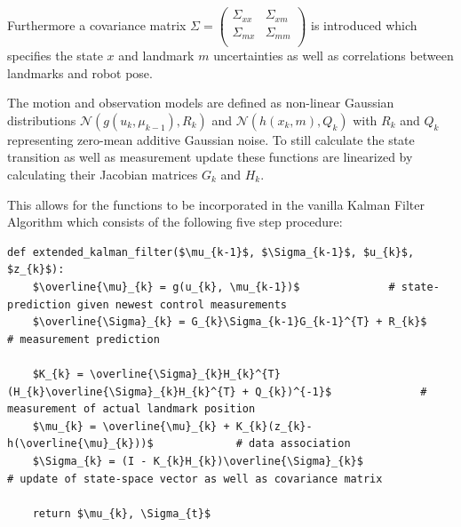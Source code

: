 Furthermore a covariance matrix 
$ \Sigma = 
\begin{pmatrix}
	\Sigma_{xx} & \Sigma_{xm} \\
	\Sigma_{mx} & \Sigma_{mm} \\
\end{pmatrix} $ 
is introduced which specifies the state $ x $ and landmark $ m $ uncertainties as well as correlations between landmarks and robot pose. 

The motion and observation models are defined as non-linear Gaussian distributions $ \mathcal{N}(g(u_{k}, \mu_{k - 1}), R_{k}) $ and $ \mathcal{N}(h(x_{k}, m), Q_{k}) $ with $ R_{k} $ and $ Q_{k} $ representing zero-mean additive Gaussian noise.
To still calculate the state transition as well as measurement update these functions are linearized by calculating their Jacobian matrices $ G_{k} $ and $ H_{k} $.

This allows for the functions to be incorporated in the vanilla Kalman Filter Algorithm which consists of the following five step procedure:

\begin{lstlisting}[mathescape=true, caption={Pseudo-Code describing the filter cycle of a Extenden Kalman Filter},captionpos=b,label={lst:kalman_filter}]
	def extended_kalman_filter($\mu_{k-1}$, $\Sigma_{k-1}$, $u_{k}$, $z_{k}$):
	$\overline{\mu}_{k} = g(u_{k}, \mu_{k-1})$				# state-prediction given newest control measurements
	$\overline{\Sigma}_{k} = G_{k}\Sigma_{k-1}G_{k-1}^{T} + R_{k}$				# measurement prediction 	 		
	
	$K_{k} = \overline{\Sigma}_{k}H_{k}^{T}(H_{k}\overline{\Sigma}_{k}H_{k}^{T} + Q_{k})^{-1}$				# measurement of actual landmark position
	$\mu_{k} = \overline{\mu}_{k} + K_{k}(z_{k}-h(\overline{\mu}_{k}))$				# data association 
	$\Sigma_{k} = (I - K_{k}H_{k})\overline{\Sigma}_{k}$				# update of state-space vector as well as covariance matrix 
	
	return $\mu_{k}, \Sigma_{t}$
\end{lstlisting}



